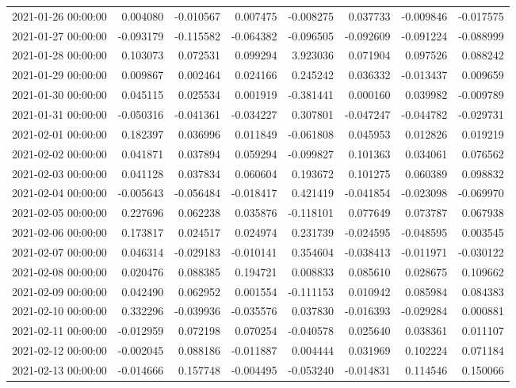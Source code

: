 \begin{tabular}{lrrrrrrr}
2021-01-26 00:00:00 & 0.004080 & -0.010567 & 0.007475 & -0.008275 & 0.037733 & -0.009846 & -0.017575 \\
2021-01-27 00:00:00 & -0.093179 & -0.115582 & -0.064382 & -0.096505 & -0.092609 & -0.091224 & -0.088999 \\
2021-01-28 00:00:00 & 0.103073 & 0.072531 & 0.099294 & 3.923036 & 0.071904 & 0.097526 & 0.088242 \\
2021-01-29 00:00:00 & 0.009867 & 0.002464 & 0.024166 & 0.245242 & 0.036332 & -0.013437 & 0.009659 \\
2021-01-30 00:00:00 & 0.045115 & 0.025534 & 0.001919 & -0.381441 & 0.000160 & 0.039982 & -0.009789 \\
2021-01-31 00:00:00 & -0.050316 & -0.041361 & -0.034227 & 0.307801 & -0.047247 & -0.044782 & -0.029731 \\
2021-02-01 00:00:00 & 0.182397 & 0.036996 & 0.011849 & -0.061808 & 0.045953 & 0.012826 & 0.019219 \\
2021-02-02 00:00:00 & 0.041871 & 0.037894 & 0.059294 & -0.099827 & 0.101363 & 0.034061 & 0.076562 \\
2021-02-03 00:00:00 & 0.041128 & 0.037834 & 0.060604 & 0.193672 & 0.101275 & 0.060389 & 0.098832 \\
2021-02-04 00:00:00 & -0.005643 & -0.056484 & -0.018417 & 0.421419 & -0.041854 & -0.023098 & -0.069970 \\
2021-02-05 00:00:00 & 0.227696 & 0.062238 & 0.035876 & -0.118101 & 0.077649 & 0.073787 & 0.067938 \\
2021-02-06 00:00:00 & 0.173817 & 0.024517 & 0.024974 & 0.231739 & -0.024595 & -0.048595 & 0.003545 \\
2021-02-07 00:00:00 & 0.046314 & -0.029183 & -0.010141 & 0.354604 & -0.038413 & -0.011971 & -0.030122 \\
2021-02-08 00:00:00 & 0.020476 & 0.088385 & 0.194721 & 0.008833 & 0.085610 & 0.028675 & 0.109662 \\
2021-02-09 00:00:00 & 0.042490 & 0.062952 & 0.001554 & -0.111153 & 0.010942 & 0.085984 & 0.084383 \\
2021-02-10 00:00:00 & 0.332296 & -0.039936 & -0.035576 & 0.037830 & -0.016393 & -0.029284 & 0.000881 \\
2021-02-11 00:00:00 & -0.012959 & 0.072198 & 0.070254 & -0.040578 & 0.025640 & 0.038361 & 0.011107 \\
2021-02-12 00:00:00 & -0.002045 & 0.088186 & -0.011887 & 0.004444 & 0.031969 & 0.102224 & 0.071184 \\
2021-02-13 00:00:00 & -0.014666 & 0.157748 & -0.004495 & -0.053240 & -0.014831 & 0.114546 & 0.150066 \\

\end{tabular}
